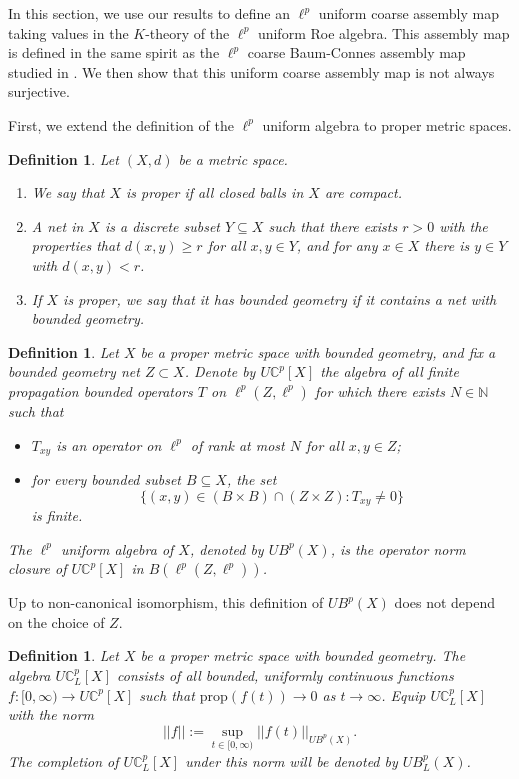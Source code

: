 \documentclass[a4,11pt]{amsart}
\newtheorem{defn}[thm]{Definition}
\theoremstyle{remark}
\begin{document}
In this section, we use our results to define an $\ell^p$ uniform coarse assembly map taking values in the $K$-theory of the $\ell^p$ uniform Roe algebra.
This assembly map is defined in the same spirit as the $\ell^p$ coarse Baum-Connes assembly map studied in \cite{Chung23,SW,ZZ}.
We then show that this uniform coarse assembly map is not always surjective.

First, we extend the definition of the $\ell^p$ uniform algebra to proper metric spaces.

\begin{defn}
Let $(X,d)$ be a metric space. 
\begin{enumerate}
\item We say that $X$ is proper if all closed balls in $X$ are compact.
\item A net in $X$ is a discrete subset $Y\subseteq X$ such that there exists $r>0$ with the properties that $d(x,y)\geq r$ for all $x,y\in Y$, and for any $x\in X$ there is $y\in Y$ with $d(x,y)<r$.
\item If $X$ is proper, we say that it has bounded geometry if it contains a net with bounded geometry.
\end{enumerate}
\end{defn}

\begin{defn}
Let $X$ be a proper metric space with bounded geometry, and fix a bounded geometry net $Z\subset X$. 
Denote by $U\mathbb{C}^p[X]$ the algebra of all finite propagation bounded operators $T$ on $\ell^p(Z,\ell^p)$ for which there exists $N\in\mathbb{N}$ such that 
\begin{itemize}
\item $T_{xy}$ is an operator on $\ell^p$ of rank at most $N$ for all $x,y\in Z$;
\item for every bounded subset $B\subseteq X$, the set \[\{(x,y)\in (B\times B)\cap(Z\times Z): T_{xy}\neq 0\}\] is finite.
\end{itemize}
The $\ell^p$ uniform algebra of $X$, denoted by $UB^p(X)$, is the operator norm closure of $U\mathbb{C}^p[X]$ in $B(\ell^p(Z,\ell^p))$.
\end{defn}

Up to non-canonical isomorphism, this definition of $UB^p(X)$ does not depend on the choice of $Z$.

\begin{defn} 
Let $X$ be a proper metric space with bounded geometry. The algebra $U\mathbb{C}^p_L[X]$ consists of all bounded, uniformly continuous functions $f:[0,\infty)\rightarrow U\mathbb{C}^p[X]$ such that $\mathrm{prop}(f(t))\rightarrow 0$ as $t\rightarrow\infty$. Equip $U\mathbb{C}^p_L[X]$ with the norm
\[ ||f||:=\sup_{t\in[0,\infty)}||f(t)||_{UB^p(X)}. \]
The completion of $U\mathbb{C}^p_L[X]$ under this norm will be denoted by $UB^p_L(X)$.
\end{defn}
\end{document}
